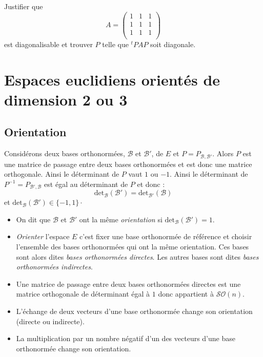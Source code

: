 \documentclass[french,11pt,twoside]{VcCours}
\begin{document}
\begin{ApplicationDirecte}{} Justifier que
  \[
  A =
  \begin{pmatrix}
    1 &  1 &  1 \\
  1 &  1 &  1 \\
    1 &  1 &  1 \\
  \end{pmatrix}
  \]
est diagonalisable et trouver $P$ telle que $^tPAP$ soit diagonale.
\end{ApplicationDirecte}



\section{Espaces euclidiens orientés de dimension 2 ou 3}
\subsection{Orientation}
Considérons deux bases orthonormées, $\mathcal{B}$ et $\mathcal{B}'$, de $E$ et $P= P_{\mathcal{B}, \mathcal{B}'}$. Alors $P$ est une matrice de passage entre deux bases orthonormées et est donc une matrice orthogonale. Ainsi le déterminant de $P$ vaut $1$ ou $-1$. Ainsi le déterminant de $P^{-1}= P_{\mathcal{B}', \mathcal{B}}$ est égal au déterminant de $P$ et donc :
$$ \textrm{det}_{\mathcal{B}}(\mathcal{B}') =  \textrm{det}_{\mathcal{B}'}(\mathcal{B})$$
et $\textrm{det}_{\mathcal{B}}(\mathcal{B}')  \in \lbrace -1,1 \rbrace \cdot$

\begin{Definition}{}
\begin{itemize}
\item On dit que $\mathcal{B}$ et $\mathcal{B}'$ ont la même \emph{orientation} si $\textrm{det}_{\mathcal{B}}(\mathcal{B}')=1$.
\item \emph{Orienter} l'espace $E$ c'est fixer une base orthonormée de référence et choisir l'ensemble des bases orthonormées qui ont la même orientation. Ces bases sont alors dites \emph{bases orthonormées directes}. Les autres bases sont dites \emph{bases orthonormées indirectes}.
\end{itemize}
\end{Definition}

\begin{Remarques}{}
\begin{itemize}
\item Une matrice de passage entre deux bases orthonormées directes est une matrice orthogonale de déterminant égal à $1$ donc appartient à $\mathcal{SO}(n)$.
\item L'échange de deux vecteurs d'une base orthonormée change son orientation (directe ou indirecte).
\item La multiplication par un nombre négatif d'un des vecteurs d'une base orthonormée change son orientation.
\end{itemize}
\end{Remarques}
\end{document}
